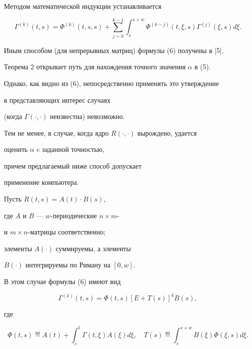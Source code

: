 Методом математической индукции устанавливается


\begin{equation}


\Gamma^{(k)}(t,s)=\Phi^{(k)}(t,s,s)+


\sum_{j=0}^{k-1}\int_s^{s+w}\Phi^{(k-j)}(t,\xi,s)


\Gamma^{(j)}(\xi,s)d\xi.


\end{equation}


Иным способом (для непрерывных матриц) формулы (6) получены в [5].





Теорема 2 открывает путь для нахождения точного значения $\alpha$ в (5).


Однако, как видно из (6), непосредственно применять это утверждение


в представляющих интерес случаях


(когда $\Gamma(\cdot,\cdot)$ неизвестна) невозможно.


Тем не менее, в случае, когда ядро $R(\cdot,\cdot)$ вырождено, удается


оценить $\alpha$ c заданной точностью,


причем предлагаемый ниже способ допускает


применение компьютера.





Пусть $R(t,s)=A(t)\cdot B(s)$,


где $A$ и $B$ --- $w$-периодические $n\times m$-


и $m\times n$-матрицы соответственно;


элементы $A(\cdot)$ суммируемы, а элементы


$B(\cdot)$ интегрируемы по Риману на $[0,w]$.


В этом случае формулы (6) имеют вид


\begin{equation}


\Gamma^{(k)}(t,s)=\Phi(t,s)[E+T(s)]^kB(s),


\end{equation}


где


$$


\Phi(t,s)\eqdef A(t)+\int_s^t\Gamma(t,\xi)A(\xi)d\xi, \quad


T(s)\eqdef \int_s^{s+w}B(\xi)\Phi(\xi,s)d\xi.


$$


